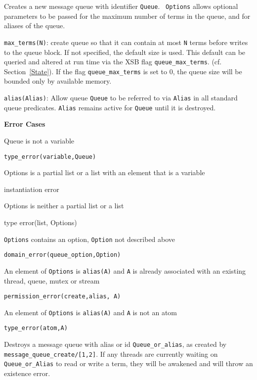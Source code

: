 \begin{description}

%
Creates a new message queue with identifier {\tt Queue}.  {\tt
  Options} allows optional parameters to be passed for the maximum
number of terms in the queue, and for aliases of the queue.
%
\bi
\item {\tt max\_terms(N)}: create queue so that it can contain at most
  {\tt N} terms before writes to the queue block.  If not specified,
  the default size is used.  This default can be queried and altered
  at run time via the XSB flag {\tt queue\_max\_terms}.
  (cf. Section~\ref{State}).  If the flag {\tt queue\_max\_terms} is
  set to 0, the queue size will be bounded only by available memory.
%
\item {\tt alias(Alias)}: Allow queue {\tt Queue} to be referred to
  via {\tt Alias} in all standard queue predicates.  {\tt Alias}
  remains active for {\tt Queue} until it is destroyed.
\ei

{\bf Error Cases}
\bi
\item 	Queue is not a variable
\bi
\item 	{\tt type\_error(variable,Queue)}
\ei
\item Options is a partial list or a list with an element that is a
  variable 
\bi
\item  instantiation error
\ei
\item Options is neither a partial list or a list
\bi
\item  type error(list, Options)
\ei
\item 	{\tt Options} contains an option, {\tt Option} not described above
\bi
\item 	{\tt domain\_error(queue\_option,Option)}
\ei
%
\item An element of {\tt Options} is {\tt alias(A)} and {\tt A} is
  already associated with an existing thread, queue, mutex or stream 
\bi
\item {\tt permission\_error(create,alias, A)}
\ei
\item An element of {\tt Options} is {\tt alias(A)} and {\tt A} is not an atom
\bi
\item {\tt type\_error(atom,A)}
\ei
\ei

%
Destroys a message queue with alias or id {\tt Queue\_or\_alias}, as
created by {\tt message\_queue\_create/[1,2]}.
If any threads are currently waiting on {\tt Queue\_or\_Alias} to read
or write a term, they will be awakened and will throw an existence
error.


\end{description}
